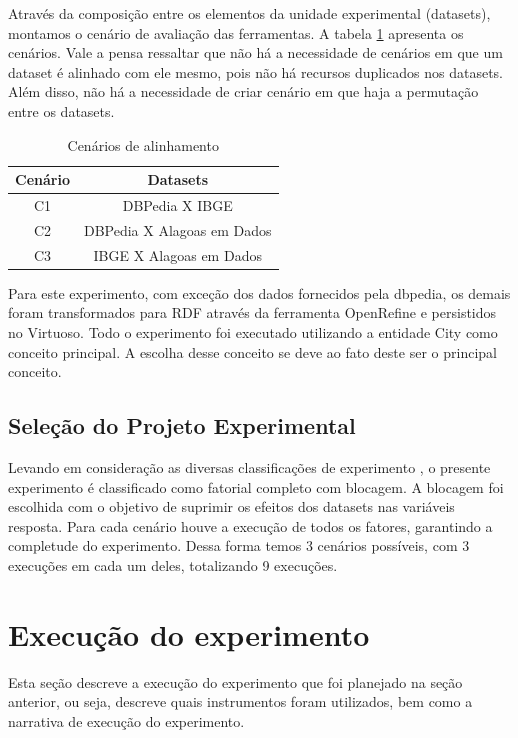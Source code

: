 Através da composição entre os elementos da unidade experimental (datasets), montamos o cenário de avaliação das ferramentas. A tabela \ref{tab:cenarios} apresenta os cenários. Vale a pensa ressaltar que não há a necessidade de cenários em que um dataset é alinhado com ele mesmo, pois não há recursos duplicados nos datasets. Além disso, não há a necessidade de criar cenário em que haja a permutação entre os datasets.

\begin{table}[h]
\centering
\caption{Cenários de alinhamento}
\label{tab:cenarios}
\begin{tabular}{|c|c|}
\hline
\textbf{Cenário} & \textbf{Datasets}          \\ \hline
C1               & DBPedia X IBGE             \\ \hline
C2               & DBPedia X Alagoas em Dados \\ \hline
C3               & IBGE X Alagoas em Dados    \\ \hline
\end{tabular}
\end{table}

Para este experimento, com exceção dos dados fornecidos pela dbpedia, os demais foram transformados para RDF através da ferramenta OpenRefine e persistidos no Virtuoso.  
Todo o experimento foi executado utilizando a entidade City como conceito principal. A escolha desse conceito se deve ao fato deste ser o principal conceito.

\subsection*{Seleção do Projeto Experimental}
Levando em consideração as diversas classificações de experimento \cite{montgomery2012design}, o presente experimento é classificado como fatorial completo com blocagem. A blocagem foi escolhida com o objetivo de suprimir os efeitos dos datasets nas variáveis resposta. Para cada cenário houve a execução de todos os fatores, garantindo a completude do experimento. Dessa forma temos 3 cenários possíveis, com 3 execuções em cada um deles, totalizando 9 execuções.

\section*{Execução do experimento}
Esta seção descreve a execução do experimento que foi planejado na seção anterior, ou seja, descreve quais instrumentos foram utilizados, bem como a narrativa de execução do experimento.

